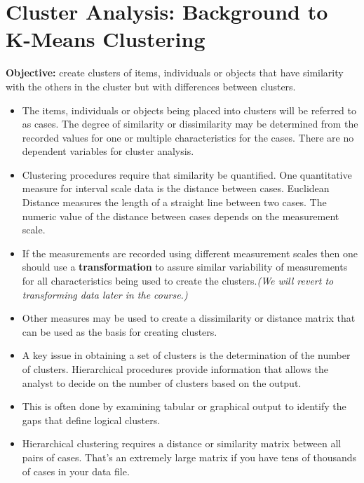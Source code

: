 \documentclass[a4paper,12pt]{article}
\begin{document}
\section{Cluster Analysis: Background to K-Means Clustering}
\noindent \textbf{Objective:} create clusters of items, individuals or objects that have similarity with the others in the cluster but with differences between clusters.  

\begin{itemize}
	\item The items, individuals or objects being placed into clusters will be referred to as cases.  The degree of similarity or dissimilarity may be determined from the recorded values for one or multiple characteristics for the cases. There are no dependent variables for cluster analysis.  
\item Clustering procedures require that similarity be quantified.  One quantitative measure for interval scale data is the distance between cases.  Euclidean Distance measures the length of a straight line between two cases.  The numeric value of the distance between cases depends on the measurement scale.  
\item If the measurements are recorded using different measurement scales then one should use a \textbf{transformation} to assure similar variability of measurements for all characteristics being used to create the clusters.\textit{(We will revert to transforming data later in the course.) }
\item Other measures may be used to create a dissimilarity or distance matrix that can be used as the basis for creating clusters. %
	
\item A key issue in obtaining a set of clusters is the determination of the number of clusters.  Hierarchical procedures provide information that allows the analyst to decide on the number of clusters based on the output. 
\item  This is often done by examining tabular or graphical output to identify the gaps that define logical clusters.  
	\item Hierarchical clustering requires a distance or similarity matrix between all pairs of cases. That's an extremely large matrix if you have tens of thousands of cases in your data file.
\end{itemize}
\end{document}
